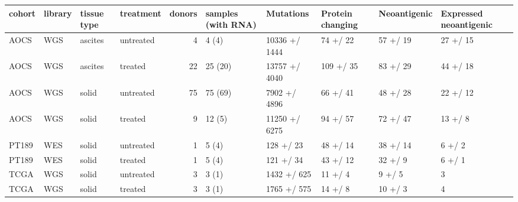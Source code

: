 \begin{tabular}{llllrlllll}
\toprule
cohort & library & tissue type &  treatment &  donors & samples (with RNA) &      Mutations & Protein changing & Neoantigenic & Expressed neoantigenic \\
\midrule
  AOCS &     WGS &     ascites &  untreated &       4 &              4 (4) &  10336 +/ 1444 &         74 +/ 22 &     57 +/ 19 &               27 +/ 15 \\
  AOCS &     WGS &     ascites &    treated &      22 &            25 (20) &  13757 +/ 4040 &        109 +/ 35 &     83 +/ 29 &               44 +/ 18 \\
  AOCS &     WGS &       solid &  untreated &      75 &            75 (69) &   7902 +/ 4896 &         66 +/ 41 &     48 +/ 28 &               22 +/ 12 \\
  AOCS &     WGS &       solid &    treated &       9 &             12 (5) &  11250 +/ 6275 &         94 +/ 57 &     72 +/ 47 &                13 +/ 8 \\
 PT189 &     WES &       solid &  untreated &       1 &              5 (4) &      128 +/ 23 &         48 +/ 14 &     38 +/ 14 &                 6 +/ 2 \\
 PT189 &     WES &       solid &    treated &       1 &              5 (4) &      121 +/ 34 &         43 +/ 12 &      32 +/ 9 &                 6 +/ 1 \\
  TCGA &     WGS &       solid &  untreated &       3 &              3 (1) &    1432 +/ 625 &          11 +/ 4 &       9 +/ 5 &                      3 \\
  TCGA &     WGS &       solid &    treated &       3 &              3 (1) &    1765 +/ 575 &          14 +/ 8 &      10 +/ 3 &                      4 \\
\bottomrule
\end{tabular}
